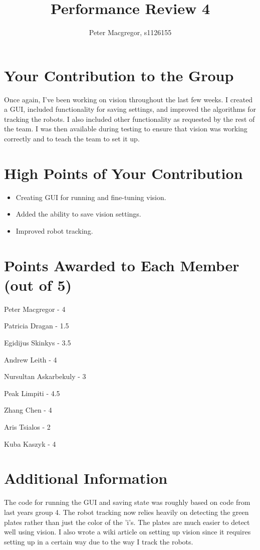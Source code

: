 \documentclass[dvips]{article}
\begin{document}
\sloppy
\title{Performance Review 4}
 
\author{Peter Macgregor, s1126155}
 
\maketitle

\section{Your Contribution to the Group}
Once again, I've been working on vision throughout the last few weeks. I created a GUI,
included functionality for saving settings, and improved the algorithms for tracking the robots.
I also included other functionality as requested by the rest of the team. I was then available
during testing to ensure that vision was working correctly and to teach the team to set it up.

\section{High Points of Your Contribution}
\begin{itemize}
  \item Creating GUI for running and fine-tuning vision.
  \item Added the ability to save vision settings.
  \item Improved robot tracking.
\end{itemize}

\section{Points Awarded to Each Member (out of 5)}
\begin{itemize}
\begin{multicols}{2}
\item Peter Macgregor - 4
\item Patricia Dragan - 1.5
\item Egidijus Skinkys - 3.5
\item Andrew Leith - 4
\item Nursultan Askarbekuly - 3
\item Peak Limpiti - 4.5
\item Zhang Chen - 4
\item Aris Tsialos - 2
\item Kuba Kaszyk - 4
\end{multicols}
\end{itemize}

\section{Additional Information}
The code for running the GUI and saving state was roughly based on code from last years group 4.
The robot tracking now relies heavily on detecting the green plates rather than just the color
of the 'i's. The plates are much easier to detect well using vision. I also wrote a wiki
article on setting up vision since it requires setting up in a certain way due to the way I
track the robots.
\end{document}
